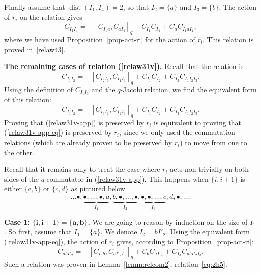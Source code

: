 \documentclass[10pt,a4paper]{amsart}
\numberwithin{equation}{section}
\theoremstyle{definition}
\begin{document}
Finally assume that $\operatorname{dist}(I_1,I_4)=2$, so that $I_2=\{a\}$ and $I_3=\{b\}$. The action of $r_i$ on the relation gives
\[C_{I_1I_4}=-[C_{I_1a},C_{aI_4}]_q+C_{I_1}C_{I_4}+C_{a}C_{I_1aI_4} ,\]
where we have used Proposition~\ref{prop-act-ri} for the action of $r_i$. This relation is proved in~\eqref{relaw43}.

{\bf The remaining cases of relation (\ref{relaw31v}).} Recall that the relation is
\begin{equation}\label{relaw31v-app}
C_{I_1I_2}=-[C_{I_2I_3},C_{I_1I_3}]_q+C_{I_1}C_{I_2}+C_{I_3}C_{I_1I_2I_3} .
\end{equation}
Using the definition of $C_{I_1I_3}$ and the $q$-Jacobi relation, we find the equivalent form of this relation:
\begin{equation}\label{relaw31v-app-eq}
C_{I_1I_2}=-[C_{I_3I_1},C_{I_2I_3}]_q+C_{I_1}C_{I_2}+C_{I_3}C_{I_1I_2I_3} .
\end{equation}
Proving that (\ref{relaw31v-app}) is preserved by $r_i$ is equivalent to proving that (\ref{relaw31v-app-eq}) is preserved by $r_i$, since we only used the commutation relations (which are already proven to be preserved by $r_i$) to move from one to the other.


Recall that it remains only to treat the case where $r_i$ acts non-trivially on both sides of the $q$-commutator in (\ref{relaw31v-app}). This happens when $\{i,i+1\}$ is either $\{a,b\}$ or $\{c,d\}$ as pictured below
\[ \ldots \bullet,\underbrace{\bullet,\dots,\bullet,a}_{I_1},\underbrace{b,\bullet,\dots,\bullet}_{I_2},\underbrace{\bullet,\bullet,\dots,c}_{I_3},d,\bullet,\ldots.\]

\textbf{Case 1: $\boldsymbol{\{i,i+1\}=\{a,b\}}$.} We are going to reason by induction on the size of $I_1$. So first, assume that $I_1=\{a\}$. We denote $I_2=bI'_2$. Using the equivalent form (\ref{relaw31v-app-eq}), the action of $r_i$ gives, according to Proposition~\ref{prop-act-ri}:
\[C_{abI'_2}=-[C_{I_3b},C_{aI'_2I_3}]_q+C_{b}C_{aI'_2}+C_{I_3}C_{abI'_2I_3} .\]
Such a relation was proven in Lemma~\ref{lemm:relcom2}, relation~\eqref{eq:2h5}.
\end{document}
